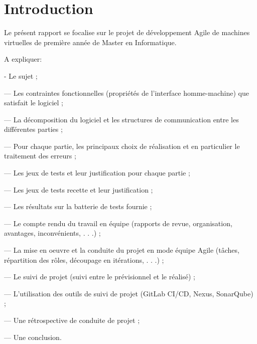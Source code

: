 \chapter{Introduction} 

Le présent rapport se focalise sur le projet de développement Agile de machines virtuelles de première année de Master en Informatique.
\bigskip

A expliquer:
\bigskip

- Le sujet ;

— Les contraintes fonctionnelles (propriétés de l’interface homme-machine) que satisfait le logiciel ;

— La décomposition du logiciel et les structures de communication entre les différentes parties ;

— Pour chaque partie, les principaux choix de réalisation et en particulier le traitement des erreurs ;

— Les jeux de tests et leur justification pour chaque partie ;

— Les jeux de tests recette et leur justification ;

— Les résultats sur la batterie de tests fournie ;

— Le compte rendu du travail en équipe (rapports de revue, organisation, avantages, inconvénients, . . .) ;

— La mise en oeuvre et la conduite du projet en mode équipe Agile (tâches, répartition des rôles, découpage
en itérations, . . .) ;

— Le suivi de projet (suivi entre le prévisionnel et le réalisé) ;

— L’utilisation des outils de suivi de projet (GitLab CI/CD, Nexus, SonarQube) ;

— Une rétrospective de conduite de projet ;

— Une conclusion.
